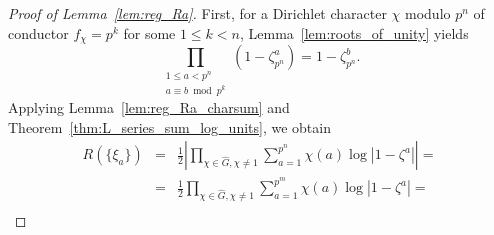 \begin{proof}[Proof of Lemma~\ref{lem:reg_Ra}]
    First, for a Dirichlet character $\chi$ modulo $p^n$ of conductor 
    $f_{\chi} = p^k$ for some $1 \leq k < n$, Lemma~\ref{lem:roots_of_unity} yields
    $$
    \prod_{\substack{1 \leq a < p^n \\ a \equiv b \bmod p^k}} (1 - \zeta_{p^n}^a) = 1 - \zeta_{p^n}^b.   
    $$
    Applying Lemma~\ref{lem:reg_Ra_charsum} and Theorem~\ref{thm:L_series_sum_log_units}, we obtain 
    \begin{eqnarray*}
        R(\{\xi_a\}) &=& \frac{1}{2} \left | \prod_{\chi \in \widehat{G}, \chi \ne 1} \sum_{a = 1}^{p^n} \chi(a) \log |1 - \zeta^a| \right | = \\
        &=& \frac{1}{2} \prod_{\chi \in \widehat{G}, \chi \ne 1} \sum_{a = 1}^{p^m} \chi(a) \log |1 - \zeta^a| = \\
    \end{eqnarray*}
\end{proof}

